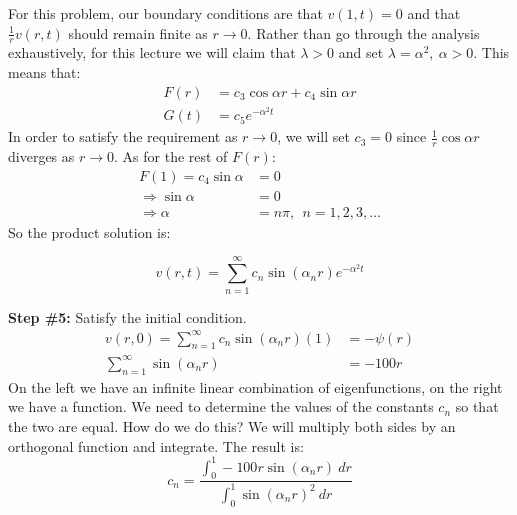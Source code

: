 \vspace{0.25cm}

\noindent For this problem, our boundary conditions are that $v(1,t) = 0$ and that $\frac{1}{r}v(r,t)$ should remain finite as $r \to 0$.  Rather than go through the analysis exhaustively, for this lecture we will claim that $\lambda > 0$ and set $\lambda = \alpha^2, \ \alpha>0$. This means that:
\begin{align*}
F(r) &= c_3\cos{\alpha r} + c_4\sin{\alpha r} \\
G(t) &= c_5e^{-\alpha^2 t}
\end{align*}
In order to satisfy the requirement as $r \to 0$, we will set $c_3 = 0$ since $\frac{1}{r}\cos{\alpha r}$ diverges as $r \to 0$.  As for the rest of $F(r)$:
\begin{align*}
F(1) = c_4\sin{\alpha} &= 0 \\
\Rightarrow \sin{\alpha} &= 0 \\
\Rightarrow \alpha &= n \pi, \ \ n=1,2,3,\dots
\end{align*}
So the product solution is:

\begin{equation}
v(r,t) = \sum\limits_{n=1}^{\infty} c_n \sin{(\alpha_n r)}e^{-\alpha^2 t}
\label{eq:lec35-ex-sol-v}
\end{equation}

\vspace{0.25cm}

\noindent\textbf{Step \#5:} Satisfy the initial condition.
\begin{align*}
v(r,0) = \sum\limits_{n=1}^{\infty}c_n \sin{(\alpha_n r)}(1) &= -\psi(r) \\
\sum\limits_{n=1}^{\infty} \sin{(\alpha_n r)} &= -100r 
\end{align*}
On the left we have an infinite linear combination of eigenfunctions, on the right we have a function.  We need to determine the values of the constants $c_n$ so that the two are equal.  How do we do this?  We will multiply both sides by an orthogonal function and integrate.  The result is:
\begin{equation}
c_n = \frac{\int_{0}^1 -100r \sin{(\alpha_n r)} \ dr}{\int_0^1 \sin{(\alpha_n r)}^2 \ dr}
\label{eq:lec35-v-coeff}
\end{equation}

